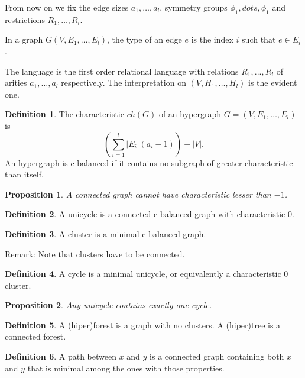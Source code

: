 \documentclass[11pt,notitlepage]{report}
\newtheorem{proposition}{Proposition}[chapter]
\theoremstyle{definition}
\newtheorem{definition}{Definition}[chapter]
\begin{document}
From now on we fix the edge sizes $a_1,\dots,a_l$, 
symmetry groups $\phi_1,dots,\phi_1$ and restrictions $R_1,\dots,R_l$. \par

In a graph $G(V,E_1,\dots, E_l)$, the type of an edge $e$ is the index
$i$ such that $e\in E_i$.  

The language is the first order relational 
language with relations $R_1,..., R_l$ of arities
$a_1,\dots, a_l$ respectively. The interpretation on 
$(V,H_1,\dots, H_l)$ is the evident one. \par

\begin{definition}
	The characteristic $ch(G)$ of an hypergraph $G=(V,E_1,\dots,E_l)$ is
	\[ \left( \sum_{i=1}^l |E_i|(a_i-1)\right) -	|V|  .\]
	An hypergraph is c-balanced if it contains no subgraph of
	greater characteristic than itself. 
\end{definition}

\begin{proposition}
	A connected graph cannot have characteristic lesser than $-1$.
\end{proposition}

\begin{definition}
	A unicycle is a connected c-balanced graph with characteristic $0$.
\end{definition}

\begin{definition} A cluster is a minimal c-balanced graph.
\end{definition}

Remark: Note that clusters have to be connected.
 
\begin{definition}
	A cycle is a minimal unicycle, or equivalently a characteristic $0$ cluster.  
\end{definition}

\begin{proposition}
	Any unicycle contains exactly one cycle. 
\end{proposition}

\begin{definition} 
	A (hiper)forest is a graph with no clusters. A (hiper)tree is a connected forest.
\end{definition}

\begin{definition} 
	A path between $x$ and $y$ is a connected graph containing both $x$ and $y$
	that is minimal among the ones with those properties. 
\end{definition}
\end{document}
